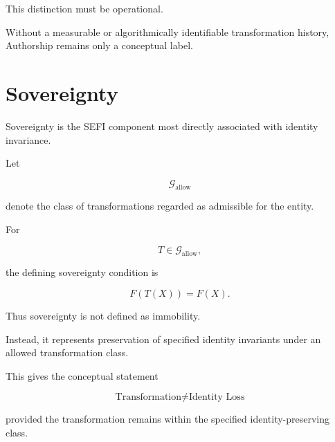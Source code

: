 \documentclass[12pt,oneside]{book}
\begin{document}
This distinction must be operational.

Without a measurable or algorithmically identifiable
transformation history, Authorship remains only a conceptual
label.


\section{Sovereignty}
\label{sec:identity-sovereignty}

Sovereignty is the SEFI component most directly associated with
identity invariance.

Let

\begin{equation}
    \mathcal{G}_{\mathrm{allow}}
\end{equation}

denote the class of transformations regarded as admissible for
the entity.

For

\begin{equation}
    T
    \in
    \mathcal{G}_{\mathrm{allow}},
\end{equation}

the defining sovereignty condition is

\begin{equation}
    F(T(X))
    =
    F(X).
    \label{eq:sovereignty-invariance}
\end{equation}

Thus sovereignty is not defined as immobility.

Instead, it represents preservation of specified identity
invariants under an allowed transformation class.

This gives the conceptual statement

\begin{equation}
    \boxed{
    \text{Transformation}
    \neq
    \text{Identity Loss}
    }
    \label{eq:transformation-not-identity-loss}
\end{equation}

provided the transformation remains within the specified
identity-preserving class.

\end{document}

